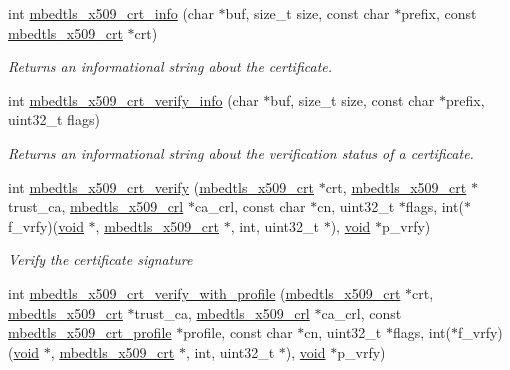\begin{DoxyCompactItemize}
int \hyperlink{group__x509__module_gabaf30f2269fc3b6608b25871f9d09da6}{mbedtls\+\_\+x509\+\_\+crt\+\_\+info} (char $\ast$buf, size\+\_\+t size, const char $\ast$prefix, const \hyperlink{structmbedtls__x509__crt}{mbedtls\+\_\+x509\+\_\+crt} $\ast$crt)
\begin{DoxyCompactList}\small\item\em Returns an informational string about the certificate. \end{DoxyCompactList}\item 
int \hyperlink{group__x509__module_gae88f1d8e6696eb2beeffe0a708219e6b}{mbedtls\+\_\+x509\+\_\+crt\+\_\+verify\+\_\+info} (char $\ast$buf, size\+\_\+t size, const char $\ast$prefix, uint32\+\_\+t flags)
\begin{DoxyCompactList}\small\item\em Returns an informational string about the verification status of a certificate. \end{DoxyCompactList}\item 
int \hyperlink{group__x509__module_ga98ed4504e4f832b735a230acf54fcde3}{mbedtls\+\_\+x509\+\_\+crt\+\_\+verify} (\hyperlink{structmbedtls__x509__crt}{mbedtls\+\_\+x509\+\_\+crt} $\ast$crt, \hyperlink{structmbedtls__x509__crt}{mbedtls\+\_\+x509\+\_\+crt} $\ast$trust\+\_\+ca, \hyperlink{structmbedtls__x509__crl}{mbedtls\+\_\+x509\+\_\+crl} $\ast$ca\+\_\+crl, const char $\ast$cn, uint32\+\_\+t $\ast$flags, int($\ast$f\+\_\+vrfy)(\hyperlink{interfacevoid}{void} $\ast$, \hyperlink{structmbedtls__x509__crt}{mbedtls\+\_\+x509\+\_\+crt} $\ast$, int, uint32\+\_\+t $\ast$), \hyperlink{interfacevoid}{void} $\ast$p\+\_\+vrfy)
\begin{DoxyCompactList}\small\item\em Verify the certificate signature \end{DoxyCompactList}\item 
int \hyperlink{group__x509__module_gaf044a51e5b5bc854bf12aeeccb440e55}{mbedtls\+\_\+x509\+\_\+crt\+\_\+verify\+\_\+with\+\_\+profile} (\hyperlink{structmbedtls__x509__crt}{mbedtls\+\_\+x509\+\_\+crt} $\ast$crt, \hyperlink{structmbedtls__x509__crt}{mbedtls\+\_\+x509\+\_\+crt} $\ast$trust\+\_\+ca, \hyperlink{structmbedtls__x509__crl}{mbedtls\+\_\+x509\+\_\+crl} $\ast$ca\+\_\+crl, const \hyperlink{structmbedtls__x509__crt__profile}{mbedtls\+\_\+x509\+\_\+crt\+\_\+profile} $\ast$profile, const char $\ast$cn, uint32\+\_\+t $\ast$flags, int($\ast$f\+\_\+vrfy)(\hyperlink{interfacevoid}{void} $\ast$, \hyperlink{structmbedtls__x509__crt}{mbedtls\+\_\+x509\+\_\+crt} $\ast$, int, uint32\+\_\+t $\ast$), \hyperlink{interfacevoid}{void} $\ast$p\+\_\+vrfy)

\end{DoxyCompactItemize}
